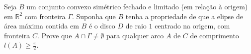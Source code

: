 Seja \(B\) um conjunto convexo simétrico fechado e limitado (em relação à origem) em \(\mathbb{R}^{2}\) com fronteira \(\Gamma\). Suponha que \(B\) tenha a propriedade de que a elipse de área máxima contida em \(B\) é o disco \(D\) de raio \(1\) centrado na origem, com fronteira \(C\). Prove que \(A \cap \Gamma \ne \emptyset\) para qualquer arco \(A\) de \(C\) de comprimento \(l(A) \geq \frac{\pi}{2}\).
